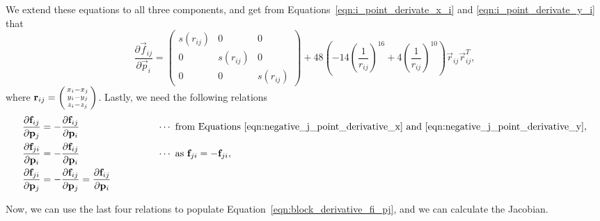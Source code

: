 \documentclass[../Main.tex]{subfiles}
\begin{document}
We extend these equations to all three components, and get from Equations~\ref{eqn:i_point_derivate_x_i} and \ref{eqn:i_point_derivate_y_i} that 
$$
\renewcommand\arraystretch{1.5}
\frac{\partial \vec{f}_{ij}}{\partial \vec{p}_{i}} = 
	\begin{pmatrix}
		s(r_{ij}) & 0 & 0 \\
		0 & s(r_{ij}) & 0 \\
		0 & 0 & s(r_{ij})
	\end{pmatrix} + 48\left(-14\left(\frac{1}{r_{ij}}\right)^{16}+ 4\left(\frac{1}{r_{ij}}\right)^{10}\right)\vec{r}_{ij}\vec{r}_{ij}^{T},
$$ where $\vec{r}_{ij} = \begin{psmallmatrix} x_{i} - x_{j} \\ y_{i} - y{_j} \\ z_{i} - z_{j}\end{psmallmatrix}$.
Lastly, we need the following relations
\begin{align*}
\frac{\partial \vec{f}_{ij}}{\partial \vec{p}_{j}} &= -\frac{\partial \vec{f}_{ij}}{\partial \vec{p}_{i}} \qquad \qquad \qquad \qquad\cdots \mbox{  from Equations \ref{eqn:negative_j_point_derivative_x} and \ref{eqn:negative_j_point_derivative_y}}, \\
\frac{\partial \vec{f}_{ji}}{\partial \vec{p}_{i}} &= -\frac{\partial \vec{f}_{ij}}{\partial \vec{p}_{i}} \qquad \qquad \qquad \qquad\cdots \mbox{  as } \vec{f}_{ji} = -\vec{f}_{ji}, \\
\frac{\partial \vec{f}_{ji}}{\partial \vec{p}_{j}} &= -\frac{\partial \vec{f}_{ij}}{\partial \vec{p}_{j}} = \frac{\partial \vec{f}_{ij}}{\partial \vec{p}_{i}}
\end{align*}

Now, we can use the last four relations to populate Equation~\ref{eqn:block_derivative_fi_pj}, and we can calculate the Jacobian.
\end{document}
